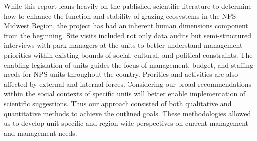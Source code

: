 While this report leans heavily on the published scientific literature to determine how to enhance the function and stability of grazing ecosystems in the NPS Midwest Region, the project has had an inherent human dimensions component from the beginning.
Site visits included not only data audits but semi-structured interviews with park managers at the units to better understand management priorities within existing bounds of social, cultural, and political constraints. 
The enabling legislation of units guides the focus of management, budget, and staffing needs for NPS units throughout the country. 
Prorities and activities are also affected by external and internal forces.
Considering our broad recommendations within the social contexts of specific units will better enable implementation of scientific suggestions.
Thus our approach consisted of both qualitative and quantitative methods to achieve the outlined goals.
These methodologies allowed us to develop unit-specific and region-wide perspectives on current management and management needs. 


